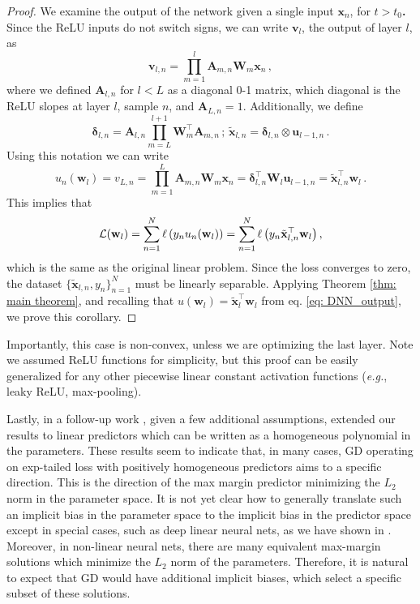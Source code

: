\documentclass[twoside,11pt,english]{article}
\begin{document}
\begin{proof}
We examine the output of the network given a single input \textbf{$\mathbf{x}_n$},
for\textbf{ $t>t_{0}$. }Since the ReLU inputs do not switch signs,
we can write $\mathbf{v}_{l}$, the output of layer $l$, as
\[
\mathbf{v}_{l,n}=\prod_{m=1}^{l}\mathbf{A}_{m,n}\mathbf{W}_{m}\mathbf{x}_n\,,
\]
where we defined $\mathbf{A}_{l,n}$ for $l<L$ as a diagonal 0-1 matrix, which diagonal is the ReLU slopes at layer $l$, sample $n$, and $\mathbf{A}_{L,n}=1$. Additionally,
we define
\[
\boldsymbol{\delta}_{l,n}=\mathbf{A}_{l,n}\prod_{m=L}^{l+1}\mathbf{W}_{m}^{\top}\mathbf{A}_{m,n}\,;\,\tilde{\mathbf{x}}_{l,n}=\boldsymbol{\delta}_{l,n}\otimes\mathbf{u}_{l-1,n}\,.
\]
Using this notation we can write 
\begin{equation} \label{eq: DNN_output}
u_n(\mathbf{w}_{l})=v_{L,n}=\prod_{m=1}^{L}\mathbf{A}_{m,n}\mathbf{W}_{m}\mathbf{x}_n=\boldsymbol{\delta}_{l,n}^{\top}\mathbf{W}_{l}\mathbf{u}_{l-1,n}=\tilde{\mathbf{x}}_{l,n}^{\top}\mathbf{w}_{l}\,.
\end{equation}
This implies that
\[
\mathcal{L}(\mathbf{w}_l)=\sum_{n=1}^{N} \ell\left(y_n u_n(\mathbf{w}_{l})\right)=\sum_{n=1}^{N} \ell\left(y_n\tilde{\mathbf{x}}_{l,n}^{\top}\mathbf{w}_{l}\right),
\]
which is the same as the original linear problem. Since the loss converges to zero, the dataset $\{\tilde{\mathbf{x}}_{l,n},y_n\}_{n=1}^N$ must be linearly separable. Applying Theorem \ref{thm: main theorem}, and recalling that $u(\mathbf{w}_{l})=\tilde{\mathbf{x}}_{l}^{\top}\mathbf{w}_{l}$ from eq. \ref{eq: DNN_output}, we prove this corollary.
\end{proof}

Importantly, this case is non-convex, unless we are optimizing the last layer. Note we assumed ReLU functions for simplicity, but this proof can be easily generalized for any other piecewise linear constant activation functions (\emph{e.g.},
leaky ReLU, max-pooling).


Lastly, in a follow-up work \citep{Gunasekar2018b}, given a few additional assumptions, extended our results to linear predictors which can be written as a homogeneous polynomial in the parameters. These results seem to indicate that, in many cases, GD operating on exp-tailed loss with positively homogeneous predictors aims to a specific direction. This is the direction of the max margin predictor minimizing the $L_2$ norm in the parameter space. It is not yet clear how to generally translate such an implicit bias in the parameter space to the implicit bias in the predictor space \textemdash{} except in special cases, such as deep linear neural nets, as we have shown in \citep{Gunasekar2018b}. Moreover, in non-linear neural nets, there are many equivalent max-margin solutions which minimize the $L_2$ norm of the parameters. Therefore, it is natural to expect that GD would have additional implicit biases, which select a specific subset of these solutions.
\end{document}

